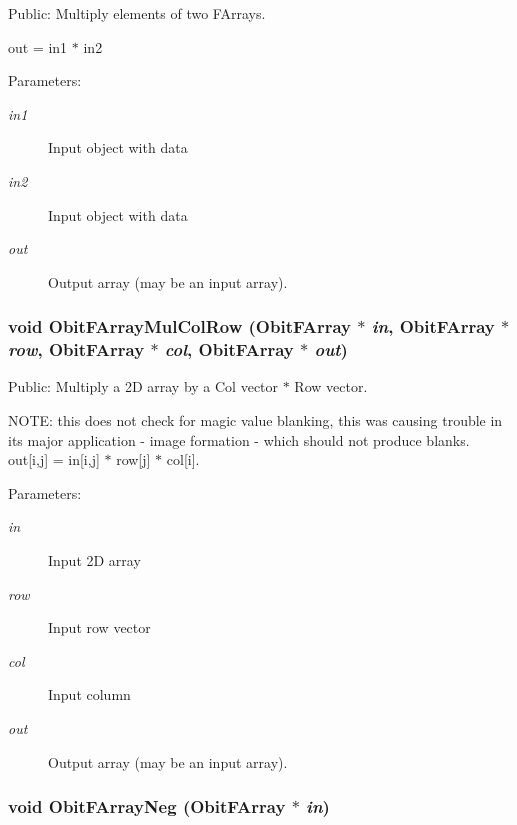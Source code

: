 Public: Multiply elements of two FArrays. 

out = in1 $\ast$ in2 \begin{Desc}
\item[Parameters:]
\begin{description}
\item[{\em in1}]Input object with data \item[{\em in2}]Input object with data \item[{\em out}]Output array (may be an input array). \end{description}
\end{Desc}
\subsubsection{\setlength{\rightskip}{0pt plus 5cm}void Obit\-FArray\-Mul\-Col\-Row ({\bf Obit\-FArray} $\ast$ {\em in}, {\bf Obit\-FArray} $\ast$ {\em row}, {\bf Obit\-FArray} $\ast$ {\em col}, {\bf Obit\-FArray} $\ast$ {\em out})}\label{ObitFArray_8c_a58}


Public: Multiply a 2D array by a Col vector $\ast$ Row vector. 

NOTE: this does not check for magic value blanking, this was causing trouble in its major application - image formation - which should not produce blanks. out[i,j] = in[i,j] $\ast$ row[j] $\ast$ col[i]. \begin{Desc}
\item[Parameters:]
\begin{description}
\item[{\em in}]Input 2D array \item[{\em row}]Input row vector \item[{\em col}]Input column \item[{\em out}]Output array (may be an input array). \end{description}
\end{Desc}
\subsubsection{\setlength{\rightskip}{0pt plus 5cm}void Obit\-FArray\-Neg ({\bf Obit\-FArray} $\ast$ {\em in})}\label{ObitFArray_8c_a36}


